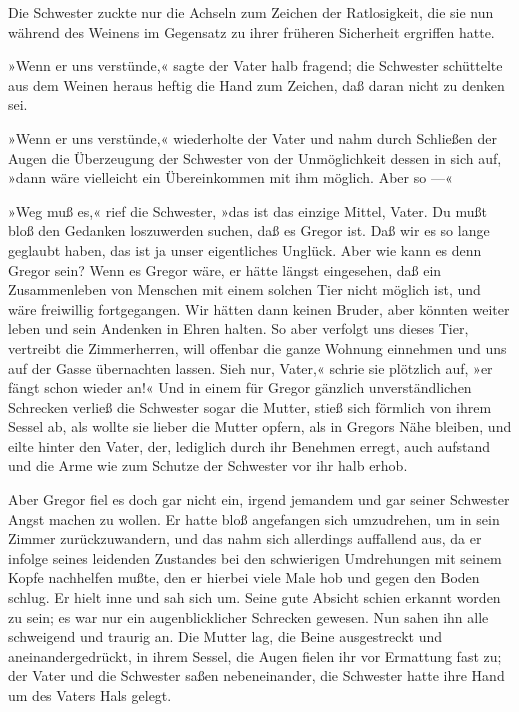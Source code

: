 Die Schwester zuckte nur die Achseln zum Zeichen der Ratlosigkeit, die
sie nun während des Weinens im Gegensatz zu ihrer früheren Sicherheit
ergriffen hatte.

»Wenn er uns verstünde,« sagte der Vater halb fragend; die Schwester
schüttelte aus dem Weinen heraus heftig die Hand zum Zeichen, daß daran
nicht zu denken sei.

»Wenn er uns verstünde,« wiederholte der Vater und nahm durch Schließen
der Augen die Überzeugung der Schwester von der Unmöglichkeit dessen in
sich auf, »dann wäre vielleicht ein Übereinkommen mit ihm möglich. Aber
so ---«

»Weg muß es,« rief die Schwester, »das ist das einzige Mittel, Vater. Du
mußt bloß den Gedanken loszuwerden suchen, daß es Gregor ist. Daß wir es
so lange geglaubt haben, das ist ja unser eigentliches Unglück. Aber wie
kann es denn Gregor sein? Wenn es Gregor wäre, er hätte längst
eingesehen, daß ein Zusammenleben von Menschen mit einem solchen Tier
nicht möglich ist, und wäre freiwillig fortgegangen. Wir hätten dann
keinen Bruder, aber könnten weiter leben und sein Andenken in Ehren
halten. So aber verfolgt uns dieses Tier, vertreibt die Zimmerherren,
will offenbar die ganze Wohnung einnehmen und uns auf der Gasse
übernachten lassen. Sieh nur, Vater,« schrie sie plötzlich auf, »er
fängt schon wieder an!« Und in einem für Gregor gänzlich
unverständlichen Schrecken verließ die Schwester sogar die Mutter, stieß
sich förmlich von ihrem Sessel ab, als wollte sie lieber die Mutter
opfern, als in Gregors Nähe bleiben, und eilte hinter den Vater, der,
lediglich durch ihr Benehmen erregt, auch aufstand und die Arme wie zum
Schutze der Schwester vor ihr halb erhob.

Aber Gregor fiel es doch gar nicht ein, irgend jemandem und gar seiner
Schwester Angst machen zu wollen. Er hatte bloß angefangen sich
umzudrehen, um in sein Zimmer zurückzuwandern, und das nahm sich
allerdings auffallend aus, da er infolge seines leidenden Zustandes bei
den schwierigen Umdrehungen mit seinem Kopfe nachhelfen mußte, den er
hierbei viele Male hob und gegen den Boden schlug. Er hielt inne und sah
sich um. Seine gute Absicht schien erkannt worden zu sein; es war nur
ein augenblicklicher Schrecken gewesen. Nun sahen ihn alle schweigend
und traurig an. Die Mutter lag, die Beine ausgestreckt und
aneinandergedrückt, in ihrem Sessel, die Augen fielen ihr vor Ermattung
fast zu; der Vater und die Schwester saßen nebeneinander, die Schwester
hatte ihre Hand um des Vaters Hals gelegt.

